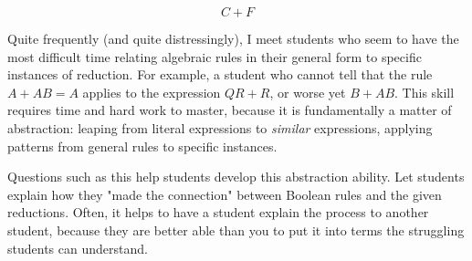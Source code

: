 $$C + F$$







Quite frequently (and quite distressingly), I meet students who seem to have the most difficult time relating algebraic rules in their general form to specific instances of reduction.  For example, a student who cannot tell that the rule $A + AB = A$ applies to the expression $QR + R$, or worse yet $B + AB$.  This skill requires time and hard work to master, because it is fundamentally a matter of abstraction: leaping from literal expressions to {\it similar} expressions, applying patterns from general rules to specific instances.

Questions such as this help students develop this abstraction ability.  Let students explain how they "made the connection" between Boolean rules and the given reductions.  Often, it helps to have a student explain the process to another student, because they are better able than you to put it into terms the struggling students can understand.




